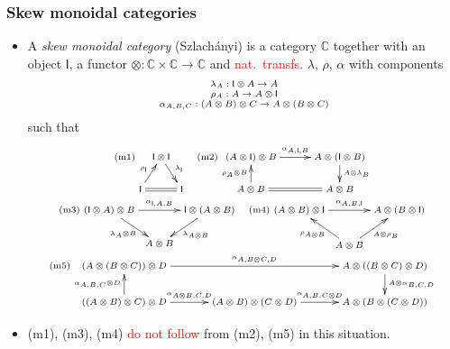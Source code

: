 \documentclass[10pt,t]{beamer}
\newcommand{\red}[1]{\textcolor{red}{#1}}
\newcommand{\I}{\mathsf{I}}
\newcommand{\ot}{\otimes}
\newcommand{\C}{\mathbb{C}}
\newcommand{\al}{\alpha}
\newcommand{\lam}{\lambda}
\begin{document}
\begin{frame}

\frametitle{Skew monoidal categories}

\begin{itemize}

\item A \emph{skew monoidal category} (Szlach{\'a}nyi) is a category $\C$
  together with an object $\I$, a functor $\ot : \C \times \C \to \C$
  and \red{nat.\ transfs.} $\lam$, $\rho$, $\al$ with components
\[
\scriptsize
\begin{array}{c}
\lam_{A} : \I \ot A \to A \\
\rho_{A} : A \to A \ot \I\\
\al_{A,B,C} : (A \ot B) \ot C \to A \ot (B \ot C)
\end{array}
\]
such that
\[
\scriptsize
\begin{array}{c}
\mathrm{(m1)}
\xymatrix@R=1.2pc@C=0.2pc{
    & \I \ot \I \ar[dr]^-{\lambda_\I} & \\
    \I \ar[ur]^-{\rho_\I} \ar@{=}[rr] & & \I
    }
\quad
\mathrm{(m2)}
\xymatrix@R=1.1pc{
      (A\ot \I) \ot B \ar[r]^{\alpha_{A,\I,B}}
      & A \ot (\I\ot B) \ar[d]^{A\ot \lambda_{B}}\\
      A \ot B \ar@{=}[r] \ar[u]^{\rho_{A}\ot B}&  A \ot B 
    }
\\
\mathrm{(m3)}
\xymatrix@C=0.2pc@R=1.2pc{
  (\I \ot A) \ot B \ar[dr]_{\lambda_A \ot B} \ar[rr]^{\alpha_{\I,A,B}} 
           & &  \I \ot (A \ot B) \ar[dl]^{\lambda_{A \ot B}}\\
  & A \ot B & 
    }
\quad
\mathrm{(m4)}
\xymatrix@C=0.2pc@R=1.3pc{
  (A \ot B) \ot \I \ar[rr]^{\alpha_{A,B,\I}} 
           & &  A \ot (B \ot \I) \\
  & A \ot B \ar[ul]^{\rho_{A \ot B}} \ar[ur]_{A \ot \rho_B} & 
    }
\\
\mathrm{(m5)}
\xymatrix@R=1.3pc@C=2.5pc{
(A\ot (B \ot C)) \ot D \ar[rr]^{\alpha_{A,B \ot C,D}}
  & & A\ot ((B \ot C)\ot D) \ar[d]^{A\ot \alpha_{B,C,D}}
  \\
((A\ot B) \ot C) \ot D \ar[u]^{\alpha_{A,B,C} \ot D}
      \ar[r]^{\alpha_{A\ot B,C,D}}
  & (A\ot B) \ot (C \ot D) \ar[r]^{\alpha_{A,B,C\ot D}}
    & A\ot (B \ot (C \ot D))
}
\end{array}
\]

\item (m1), (m3), (m4) \red{do not follow} from (m2), (m5) in this
  situation.

\end{itemize}

\end{frame}
\end{document}
